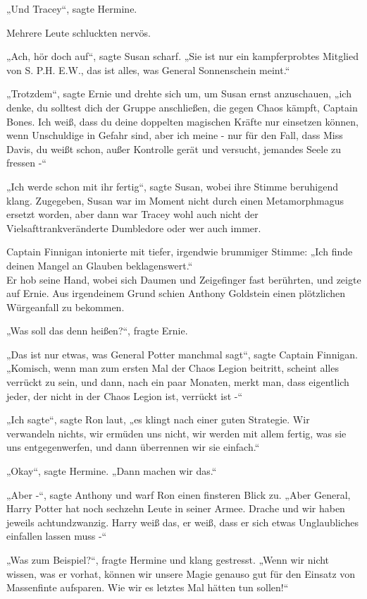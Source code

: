 {„Und Tracey“, sagte Hermine.

Mehrere Leute schluckten nervös.

„Ach, hör doch auf“, sagte Susan scharf. „Sie ist nur ein kampferprobtes Mitglied von S. P.H. E.W., das ist alles, was General Sonnenschein meint.“

„Trotzdem“, sagte Ernie und drehte sich um, um Susan ernst anzuschauen, „ich denke, du solltest dich der Gruppe anschließen, die gegen Chaos kämpft, Captain Bones. Ich weiß, dass du deine doppelten magischen Kräfte nur einsetzen können, wenn Unschuldige in Gefahr sind, aber ich meine - nur für den Fall, dass Miss Davis, du weißt schon, außer Kontrolle gerät und versucht, jemandes Seele zu fressen -“

„Ich werde schon mit ihr fertig“, sagte Susan, wobei ihre Stimme beruhigend klang. Zugegeben, Susan war im Moment nicht durch einen Metamorphmagus ersetzt worden, aber dann war Tracey wohl auch nicht der Vielsafttrankveränderte Dumbledore oder wer auch immer.

Captain Finnigan intonierte mit tiefer, irgendwie brummiger Stimme: „Ich finde deinen Mangel an Glauben beklagenswert.“\\ Er hob seine Hand, wobei sich Daumen und Zeigefinger fast berührten, und zeigte auf Ernie. Aus irgendeinem Grund schien Anthony Goldstein einen plötzlichen Würgeanfall zu bekommen.

„Was soll das denn heißen?“, fragte Ernie.

„Das ist nur etwas, was General Potter manchmal sagt“, sagte Captain Finnigan. „Komisch, wenn man zum ersten Mal der Chaos Legion beitritt, scheint alles verrückt zu sein, und dann, nach ein paar Monaten, merkt man, dass eigentlich jeder, der nicht in der Chaos Legion ist, verrückt ist -“

„Ich sagte“, sagte Ron laut, „es klingt nach einer guten Strategie. Wir verwandeln nichts, wir ermüden uns nicht, wir werden mit allem fertig, was sie uns entgegenwerfen, und dann überrennen wir sie einfach.“

„Okay“, sagte Hermine. „Dann machen wir das.“

„Aber -“, sagte Anthony und warf Ron einen finsteren Blick zu. „Aber General, Harry Potter hat noch sechzehn Leute in seiner Armee. Drache und wir haben jeweils achtundzwanzig. Harry weiß das, er weiß, dass er sich etwas Unglaubliches einfallen lassen muss -“

„Was zum Beispiel?“, fragte Hermine und klang gestresst. „Wenn wir nicht wissen, was er vorhat, können wir unsere Magie genauso gut für den Einsatz von Massenfinte aufsparen. Wie wir es letztes Mal hätten tun sollen!“

}
